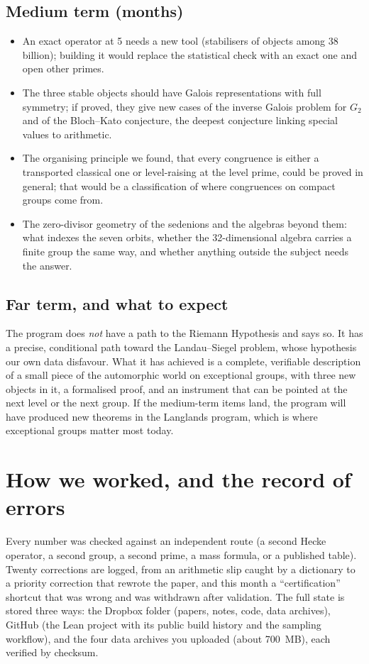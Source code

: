 \documentclass[11pt]{article}
\begin{document}
\subsection{Medium term (months)}
\begin{itemize}[nosep]
\item An exact operator at 5 needs a new tool (stabilisers of objects among 38 billion); building it would replace the statistical check with an exact one and open other primes.
\item The three stable objects should have Galois representations with full symmetry; if proved, they give new cases of the inverse Galois problem for $G_2$ and of the Bloch--Kato conjecture, the deepest conjecture linking special values to arithmetic.
\item The organising principle we found, that every congruence is either a transported classical one or level-raising at the level prime, could be proved in general; that would be a classification of where congruences on compact groups come from.
\item The zero-divisor geometry of the sedenions and the algebras beyond them: what indexes the seven orbits, whether the 32-dimensional algebra carries a finite group the same way, and whether anything outside the subject needs the answer.
\end{itemize}
\subsection{Far term, and what to expect}
The program does \emph{not} have a path to the Riemann Hypothesis and says so. It has a precise, conditional path toward the Landau--Siegel problem, whose hypothesis our own data disfavour. What it has achieved is a complete, verifiable description of a small piece of the automorphic world on exceptional groups, with three new objects in it, a formalised proof, and an instrument that can be pointed at the next level or the next group. If the medium-term items land, the program will have produced new theorems in the Langlands program, which is where exceptional groups matter most today.

\section{How we worked, and the record of errors}
Every number was checked against an independent route (a second Hecke operator, a second group, a second prime, a mass formula, or a published table). Twenty corrections are logged, from an arithmetic slip caught by a dictionary to a priority correction that rewrote the paper, and this month a ``certification'' shortcut that was wrong and was withdrawn after validation. The full state is stored three ways: the Dropbox folder (papers, notes, code, data archives), GitHub (the Lean project with its public build history and the sampling workflow), and the four data archives you uploaded (about 700~MB), each verified by checksum.
\end{document}
